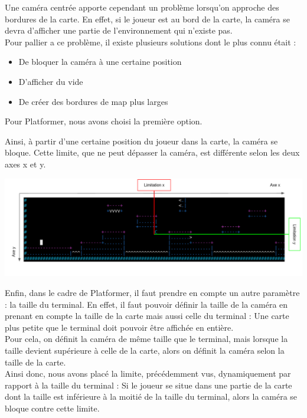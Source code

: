 \documentclass[12pt]{article}
\begin{document}
		Une caméra centrée apporte cependant un problème lorsqu'on approche des bordures de la carte.
		En effet, si le joueur est au bord de la carte, la caméra se devra d'afficher une partie de l'environnement qui n'existe pas. \\
		
		
		Pour pallier a ce problème, il existe plusieurs solutions dont le plus connu était :
		\begin{itemize}
			\item De bloquer la caméra à une certaine position
			\item D'afficher du vide
			\item De créer des bordures de map plus larges \\
		\end{itemize}
		
		
		Pour Platformer, nous avons choisi la première option.
		
		Ainsi, à partir d'une certaine position du joueur dans la carte, la caméra se bloque.
		Cette limite, que ne peut dépasser la caméra, est différente selon les deux axes x et y.
		\begin{center}
			\includegraphics[width = 0.90 \textwidth]{content/affichage3.png}
		\end{center}
		
		Enfin, dans le cadre de Platformer, il faut prendre en compte un autre paramètre : la taille du terminal.
		En effet, il faut pouvoir définir la taille de la caméra en prenant en compte la taille de la carte mais aussi celle du terminal :
		Une carte plus petite que le terminal doit pouvoir être affichée en entière. \\
		
		
		Pour cela, on définit la caméra de même taille que le terminal, mais lorsque la taille devient supérieure à celle de la carte,
		alors on définit la caméra selon la taille de la carte. \\
		
		
		Ainsi donc, nous avons placé la limite, précédemment vus, dynamiquement par rapport à la taille du terminal : 
		Si le joueur se situe dans une partie de la carte dont la taille est inférieure à la moitié de la taille du terminal,
		alors la caméra se bloque contre cette limite. \\
		
\end{document}

